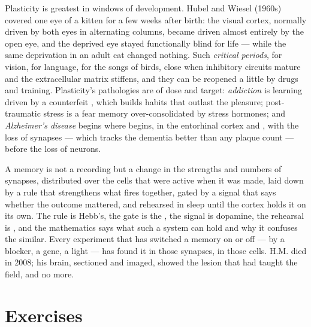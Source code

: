 \begin{definition}\label{def:b3:learning-memory:critical}
Plasticity is greatest in windows of development. Hubel and Wiesel
(1960s) covered one eye of a kitten for a few weeks after birth: the
visual cortex, normally driven by both eyes in alternating columns,
became driven almost entirely by the open eye, and the deprived eye
stayed functionally blind for life --- while the same deprivation in an
adult cat changed nothing. Such \emph{critical periods}, for vision,
for language, for the songs of birds, close when inhibitory circuits
mature and the extracellular matrix stiffens, and they can be reopened
a little by drugs and training. Plasticity's pathologies are of dose
and target: \emph{addiction} is learning driven by a counterfeit
, which builds habits that outlast the pleasure;
post-traumatic stress is a fear memory over-consolidated by stress
hormones; and \emph{Alzheimer's disease} begins where 
begins, in the entorhinal cortex and , with the loss of
synapses --- which tracks the dementia better than any plaque count ---
before the loss of neurons.
\end{definition}

\begin{remark}\label{rem:b3:learning-memory:what}
A memory is not a recording but a change in the strengths and numbers
of synapses, distributed over the cells that were active when it was
made, laid down by a rule that strengthens what fires together, gated
by a signal that says whether the outcome mattered, and rehearsed in
sleep until the cortex holds it on its own. The rule is Hebb's, the
gate is the , the signal is dopamine, the rehearsal is
, and the mathematics says what such a system can hold and why
it confuses the similar. Every experiment that has switched a memory
on or off --- by a blocker, a gene, a light --- has found it in those
synapses, in those cells. H.M. died in 2008; his brain, sectioned and
imaged, showed the lesion that had taught the field, and no more.
\end{remark}

\section{Exercises}

